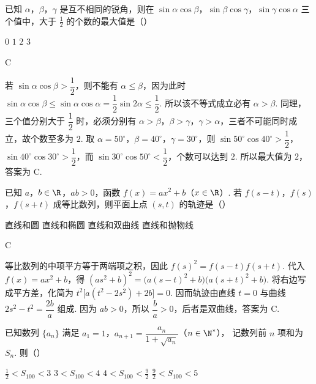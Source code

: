 \begin{problem}
已知 \(\alpha\)，\(\beta\)，\(\gamma\) 是互不相同的锐角，则在
\(\sin\alpha\cos\beta\)，\(\sin\beta\cos\gamma\)，\(\sin\gamma\cos\alpha\)
三个值中，大于 \(\frac{1}{2}\) 的个数的最大值是（\quad）

\choices
    {\(0\)}
    {\(1\)}
    {\(2\)}
    {\(3\)}
\end{problem}

\begin{answer}
C
\end{answer}

\begin{solution}
若 \(\sin\alpha\cos\beta>\dfrac12\)，则不能有 \(\alpha\leq\beta\)，因为此时
\(\sin\alpha\cos\beta\leq\sin\alpha\cos\alpha=\dfrac12\sin2\alpha\leq\dfrac12\). 所以该不等式成立必有 \(\alpha>\beta\). 同理，三个值分别大于 \(\dfrac12\) 时，必须分别有 \(\alpha>\beta\)，\(\beta>\gamma\)，\(\gamma>\alpha\)，三者不可能同时成立，故个数至多为 \(2\). 取 \(\alpha=50^{\circ}\)，\(\beta=40^{\circ}\)，\(\gamma=30^{\circ}\)，则
\(\sin50^{\circ}\cos40^{\circ}>\dfrac12\)，\(\sin40^{\circ}\cos30^{\circ}>\dfrac12\)，而 \(\sin30^{\circ}\cos50^{\circ}<\dfrac12\)，个数可以达到 \(2\). 所以最大值为 \(2\)，答案为 C.
\end{solution}

\begin{problem}
已知 \(a\)，\(b\in\R\)，\(ab>0\)，函数
\(f(x)=ax^{2}+b\)（\(x\in\R\)）. 若
\(f(s-t)\)，\(f(s)\)，\(f(s+t)\) 成等比数列，则平面上点 \((s,t)\) 的轨迹是（\quad）

\choices
    {直线和圆}
    {直线和椭圆}
    {直线和双曲线}
    {直线和抛物线}
\end{problem}

\begin{answer}
C
\end{answer}

\begin{solution}
等比数列的中项平方等于两端项之积，因此
\(f(s)^{2}=f(s-t)f(s+t)\). 代入 \(f(x)=ax^{2}+b\)，得
\((as^{2}+b)^{2}=\bigl(a(s-t)^{2}+b\bigr)\bigl(a(s+t)^{2}+b\bigr)\). 将右边写成平方差，化简为
\(t^{2}\bigl[a(t^{2}-2s^{2})+2b\bigr]=0\). 因而轨迹由直线 \(t=0\) 与曲线 \(2s^{2}-t^{2}=\dfrac{2b}{a}\) 组成. 因为 \(ab>0\)，所以 \(\dfrac ba>0\)，后者是双曲线，答案为 C.
\end{solution}

\begin{problem}
已知数列 \(\{a_n\}\) 满足
\(a_1=1\)，\(a_{n+1}=\dfrac{a_n}{1+\sqrt{a_n}}\)（\(n\in\N^*\)），
记数列前 \(n\) 项和为 \(S_n\). 则（\quad）

\choices
    {\(\frac{1}{2}<S_{100}<3\)}
    {\(3<S_{100}<4\)}
    {\(4<S_{100}<\frac{9}{2}\)}
    {\(\frac{9}{2}<S_{100}<5\)}
\end{problem}

